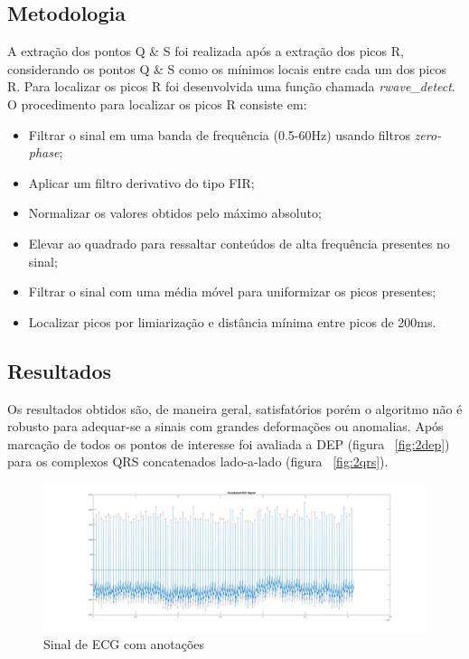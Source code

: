 \documentclass{article}
\begin{document}
\subsection{Metodologia}
A extração dos pontos Q \& S foi realizada após a extração dos picos R, considerando os pontos Q \& S como os mínimos locais entre cada um dos picos R. Para localizar os picos R foi desenvolvida uma função chamada \textit{rwave\_detect}. O procedimento para localizar os picos R consiste em:
\begin{itemize}
	\item Filtrar o sinal em uma banda de frequência (0.5-60Hz) usando filtros \textit{zero-phase};
	\item Aplicar um filtro derivativo do tipo FIR;
	\item Normalizar os valores obtidos pelo máximo absoluto;
	\item Elevar ao quadrado para ressaltar conteúdos de alta frequência presentes no sinal;
	\item Filtrar o sinal com uma média móvel para uniformizar os picos presentes;
	\item Localizar picos por limiarização e distância mínima entre picos de 200ms.
\end{itemize}

\subsection{Resultados}
Os resultados obtidos são, de maneira geral, satisfatórios porém o algoritmo não é robusto para adequar-se a sinais com grandes deformações ou anomalias. Após marcação de todos os pontos de interesse foi avaliada a DEP (figura ~\ref{fig:2dep}) para os complexos QRS concatenados lado-a-lado (figura ~\ref{fig:2qrs}).

\begin{figure}[H]
	\begin{center}
		\includegraphics[scale=0.11]{Figures/ann_ecg.png}
		\caption{Sinal de ECG com anotações}
		\label{fig:2ann}
	\end{center}
\end{figure}
\end{document}
